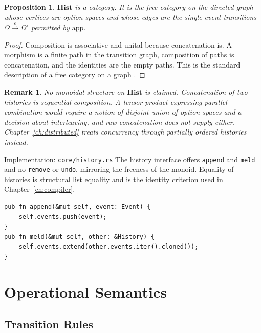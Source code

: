 \documentclass[12pt,oneside,openany]{book}
\theoremstyle{spherepop}
\newtheorem{proposition}[definition]{Proposition}
\theoremstyle{remarkstyle}
\newtheorem{remark}[definition]{Remark}
\newcommand{\Hist}{\mathbf{Hist}}
\begin{document}
\begin{proposition}
$\Hist$ is a category. It is the free category on the directed graph whose vertices are option spaces and whose edges are the single-event transitions $\Omega\xrightarrow{e}\Omega'$ permitted by $\mathrm{app}$.
\end{proposition}

\begin{proof}
Composition is associative and unital because concatenation is. A morphism is a finite path in the transition graph, composition of paths is concatenation, and the identities are the empty paths. This is the standard description of a free category on a graph \cite{maclane}.
\end{proof}

\begin{remark}
No monoidal structure on $\Hist$ is claimed. Concatenation of two histories is sequential composition. A tensor product expressing parallel combination would require a notion of disjoint union of option spaces and a decision about interleaving, and raw concatenation does not supply either. Chapter~\ref{ch:distributed} treats concurrency through partially ordered histories instead.
\end{remark}

\begin{implbox}{Implementation: \texttt{core/history.rs}}
The history interface offers \texttt{append} and \texttt{meld} and no \texttt{remove} or \texttt{undo}, mirroring the freeness of the monoid. Equality of histories is structural list equality and is the identity criterion used in Chapter~\ref{ch:compiler}.
\begin{lstlisting}
pub fn append(&mut self, event: Event) {
    self.events.push(event);
}
pub fn meld(&mut self, other: &History) {
    self.events.extend(other.events.iter().cloned());
}
\end{lstlisting}
\end{implbox}

\chapter{Operational Semantics}
\label{ch:opsem}

\section{Transition Rules}
\end{document}
